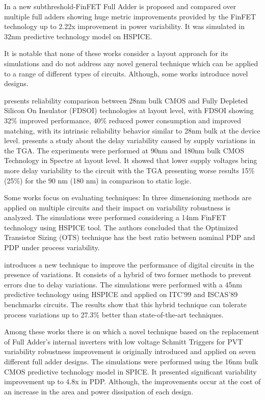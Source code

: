 \documentclass[ecp,tc, english]{iiufrgs}
\begin{document}
In \cite{islam2011variability} a new subthreshold-FinFET Full Adder is proposed and compared over multiple full adders showing huge metric improvements provided by the FinFET technology up to 2.22x improvement in power variability. It was simulated in 32nm predictive technology model on HSPICE. 

It is notable that none of these works consider a layout approach for its simulations and do not address any novel general technique which can be applied to a range of different types of circuits. Although, some works introduce novel designs.

\cite{federspiel201228nm} presents reliability comparison between 28nm bulk CMOS and Fully Depleted Silicon On Insulator (FDSOI) technologies at layout level, with FDSOI showing 32\% improved performance, 40\% reduced power consumption and improved matching, with its intrinsic reliability behavior similar to 28nm bulk at the device level. \cite{alioto2007delay} presents a study about the delay variability caused by supply variations in the TGA. The experiments were performed at 90nm and 180nm bulk CMOS Technology in Spectre at layout level. It showed that lower supply voltages bring more delay variability to the circuit with the TGA presenting worse results 15\% (25\%) for the 90 nm (180 nm) in comparison to static logic.

Some works focus on evaluating techniques: In \cite{zimpeck2016finfet} three dimensioning methods are applied on multiple circuits and their impact on variability robustness is analyzed. The simulations were performed considering a 14nm FinFET technology using HSPICE tool. The authors concluded that the Optimized Transistor Sizing (OTS) technique has the best ratio between nominal PDP and PDP under process variability.

\cite{ahmadi2017hybrid} introduces a new technique to improve the performance of digital circuits in the presence of variations. It consists of a hybrid of two former methods to prevent errors due to delay variations. The simulations were performed with a 45nm predictive technology using HSPICE and applied on ITC’99 and ISCAS’89 benchmarks circuits. The results show that this hybrid technique can tolerate process variations up to 27.3\% better than state-of-the-art techniques.

Among these works there is \cite{dokania2015circuit} on which a novel technique based on the replacement of Full Adder’s internal inverters with low voltage Schmitt Triggers for PVT variability robustness improvement is originally introduced and applied on seven different full adder designs. The simulations were performed using the 16nm bulk CMOS predictive technology model in SPICE. It presented significant variability improvement up to 4.8x in PDP. Although, the improvements occur at the cost of an increase in the area and power dissipation of each design.    
\end{document}

